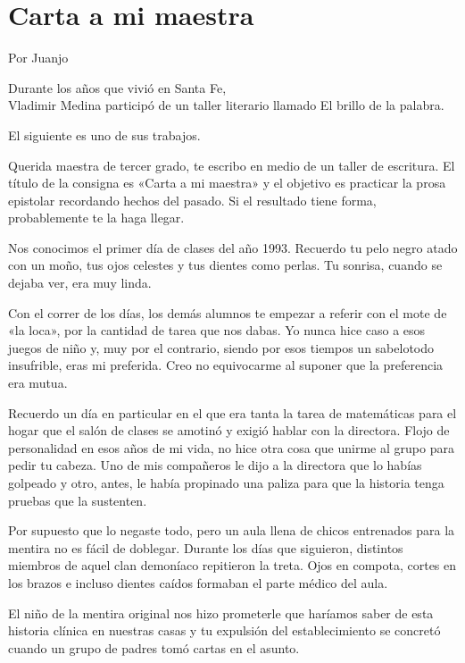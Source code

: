 \documentclass[11pt,twoside,openright,a5paper]{book}
\begin{document}
\section*{Carta a mi maestra}

\begin{flushright}Por Juanjo\end{flushright}

\begin{flushright}
Durante los años que vivió en Santa Fe,\\
Vladimir Medina participó de un taller literario llamado El brillo de la palabra.

El siguiente es uno de sus trabajos.
\end{flushright}

Querida maestra de tercer grado, te escribo en medio de un taller de escritura. El título de la consigna es «Carta a mi maestra» y el objetivo es practicar la prosa epistolar recordando hechos del pasado. Si el resultado tiene forma, probablemente te la haga llegar.

Nos conocimos el primer día de clases del año 1993. Recuerdo tu pelo negro atado con un moño, tus ojos celestes y tus dientes como perlas. Tu sonrisa, cuando se dejaba ver, era muy linda.

Con el correr de los días, los demás alumnos te empezar a referir con el mote de «la loca»,  por la cantidad de tarea que nos dabas. Yo nunca hice caso a esos juegos de niño y, muy por el contrario, siendo por esos tiempos un sabelotodo insufrible, eras mi preferida. Creo no equivocarme al suponer que la preferencia era mutua.

Recuerdo un día en particular en el que era tanta la tarea de matemáticas para el hogar que el salón de clases se amotinó y exigió hablar con la directora. Flojo de personalidad en esos años de mi vida, no hice otra cosa que unirme al grupo para pedir tu cabeza. Uno de mis compañeros le dijo a la directora que lo habías golpeado y otro, antes, le había propinado una paliza para que la historia tenga pruebas que la sustenten. 

Por supuesto que lo negaste todo, pero un aula llena de chicos entrenados para la mentira no es fácil de doblegar. Durante los días que siguieron, distintos miembros de aquel clan demoníaco repitieron la treta. Ojos en compota, cortes en los brazos e incluso dientes caídos formaban el parte médico del aula.

El niño de la mentira original nos hizo prometerle que haríamos saber de esta historia clínica en nuestras casas y tu expulsión del establecimiento se concretó cuando un grupo de padres tomó cartas en el asunto.
\end{document}
